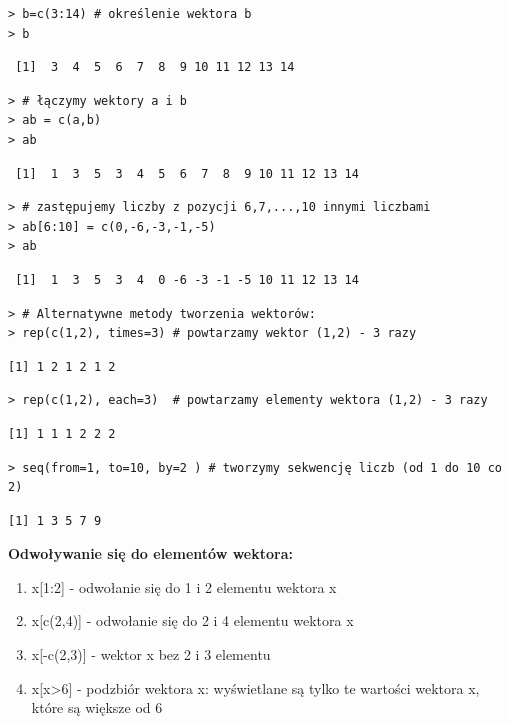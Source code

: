 \documentclass[12pt,B5paper,]{book}
\begin{document}
\begin{verbatim}
> b=c(3:14) # określenie wektora b
> b
\end{verbatim}

\begin{verbatim}
 [1]  3  4  5  6  7  8  9 10 11 12 13 14
\end{verbatim}

\begin{verbatim}
> # łączymy wektory a i b
> ab = c(a,b)
> ab
\end{verbatim}

\begin{verbatim}
 [1]  1  3  5  3  4  5  6  7  8  9 10 11 12 13 14
\end{verbatim}

\begin{verbatim}
> # zastępujemy liczby z pozycji 6,7,...,10 innymi liczbami
> ab[6:10] = c(0,-6,-3,-1,-5) 
> ab
\end{verbatim}

\begin{verbatim}
 [1]  1  3  5  3  4  0 -6 -3 -1 -5 10 11 12 13 14
\end{verbatim}

\begin{verbatim}
> # Alternatywne metody tworzenia wektorów:
> rep(c(1,2), times=3) # powtarzamy wektor (1,2) - 3 razy
\end{verbatim}

\begin{verbatim}
[1] 1 2 1 2 1 2
\end{verbatim}

\begin{verbatim}
> rep(c(1,2), each=3)  # powtarzamy elementy wektora (1,2) - 3 razy
\end{verbatim}

\begin{verbatim}
[1] 1 1 1 2 2 2
\end{verbatim}

\begin{verbatim}
> seq(from=1, to=10, by=2 ) # tworzymy sekwencję liczb (od 1 do 10 co 2)
\end{verbatim}

\begin{verbatim}
[1] 1 3 5 7 9
\end{verbatim}

\vspace{0.8cm} \textbf{Odwoływanie się do elementów wektora:}

\begin{enumerate}
\def\labelenumi{\alph{enumi})}
\item
  x{[}1:2{]} - odwołanie się do 1 i 2 elementu wektora x
\item
  x{[}c(2,4){]} - odwołanie się do 2 i 4 elementu wektora x
\item
  x{[}-c(2,3){]} - wektor x bez 2 i 3 elementu
\item
  x{[}x\textgreater{}6{]} - podzbiór wektora x: wyświetlane są tylko te
  wartości wektora x, które są większe od 6
\end{enumerate}
\end{document}
